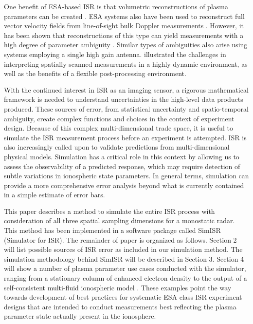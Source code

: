 \documentclass[draft,ras]{agutex}
\begin{document}
\begin{article}
One benefit of ESA-based ISR is that volumetric reconstructions of plasma parameters can be created \citep{Semeter2009738, Nicolls:2007ie, dahlgren2012di}. ESA systems also have been used to reconstruct full vector velocity fields from line-of-sight bulk Doppler measurements \citep{butler:imagingfregiondrifts,RDS:RDS20195}. However, it has been shown that reconstructions of this type can yield measurements with a high degree of parameter ambiguity \citep{Dahlgren:2012dq}. Similar types of ambiguities also arise using systems employing a single high gain antenna.  \citet{Semeter:2005fo} illustrated the challenges in interpreting spatially scanned measurements in a highly dynamic environment, as well as the benefits of a flexible post-processing environment.

With the continued interest in ISR as an imaging sensor, a rigorous mathematical framework is needed to understand uncertainties in the high-level data products produced.  These sources of error, from statistical uncertainty and spatio-temporal ambiguity, create complex functions and choices in the context of experiment design. Because of this complex multi-dimensional trade space, it is useful to simulate the ISR measurement process before an experiment is attempted.  ISR is also increasingly called upon to validate predictions from multi-dimensional physical models.  Simulation has a critical role in this context by allowing us to assess the observability of a predicted  response, which may require detection of subtle variations in ionospheric state parameters.   In general terms, simulation can provide a more comprehensive error analysis beyond what is currently contained in a simple estimate of error bars. 

This paper describes a method to simulate the entire ISR process with consideration of all three spatial sampling dimensions for a monostatic radar. This method has been implemented in a software package called SimISR (Simulator for ISR).  
The remainder of paper is organized as follows. Section 2 will list possible sources of ISR error as included in our simulation method. The simulation methodology behind SimISR will be described in Section 3. Section 4 will show a number of plasma parameter use cases conducted with the simulator, ranging from a stationary column of enhanced electron density to the output of a self-consistent multi-fluid ionospheric model \citep{semeter:plasmatransport2012}. These examples point the way towards development of best practices for systematic ESA class ISR experiment designs that are intended to conduct measurements best reflecting the plasma parameter state actually present in the ionosphere.

\end{article}
\end{document}
